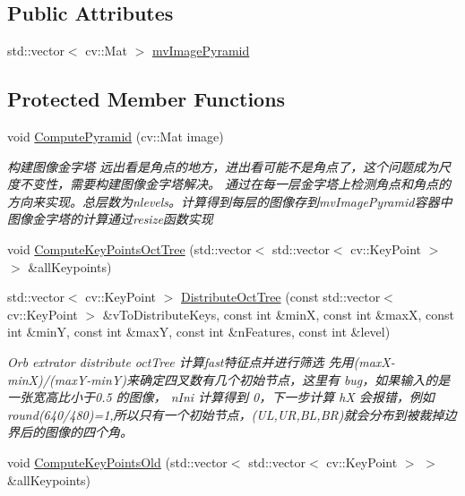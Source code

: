 \subsection*{Public Attributes}
\begin{DoxyCompactItemize}
\item 
std\+::vector$<$ cv\+::\+Mat $>$ \mbox{\hyperlink{class_o_r_b___s_l_a_m2_1_1_o_r_bextractor_a57f88e0959582dde9ae5bdee1fe3de65}{mv\+Image\+Pyramid}}
\end{DoxyCompactItemize}
\subsection*{Protected Member Functions}
\begin{DoxyCompactItemize}
\item 
void \mbox{\hyperlink{class_o_r_b___s_l_a_m2_1_1_o_r_bextractor_a058f24d80bb0b2c7d6fc0bdd3d9144d1}{Compute\+Pyramid}} (cv\+::\+Mat image)
\begin{DoxyCompactList}\small\item\em 构建图像金字塔 远出看是角点的地方，进出看可能不是角点了，这个问题成为尺度不变性，需要构建图像金字塔解决。 通过在每一层金字塔上检测角点和角点的方向来实现。总层数为nlevels。计算得到每层的图像存到mv\+Image\+Pyramid容器中 图像金字塔的计算通过resize函数实现 \end{DoxyCompactList}\item 
void \mbox{\hyperlink{class_o_r_b___s_l_a_m2_1_1_o_r_bextractor_a9a543d9b2aec1e521058ee9522937adc}{Compute\+Key\+Points\+Oct\+Tree}} (std\+::vector$<$ std\+::vector$<$ cv\+::\+Key\+Point $>$ $>$ \&all\+Keypoints)
\item 
std\+::vector$<$ cv\+::\+Key\+Point $>$ \mbox{\hyperlink{class_o_r_b___s_l_a_m2_1_1_o_r_bextractor_ac6b7b27447324af33fa60d6dc0c8ffa0}{Distribute\+Oct\+Tree}} (const std\+::vector$<$ cv\+::\+Key\+Point $>$ \&v\+To\+Distribute\+Keys, const int \&minX, const int \&maxX, const int \&minY, const int \&maxY, const int \&n\+Features, const int \&level)
\begin{DoxyCompactList}\small\item\em Orb extrator distribute oct\+Tree 计算fast特征点并进行筛选 先用(max\+X-\/minX)/(max\+Y-\/minY)来确定四叉数有几个初始节点，这里有 bug，如果输入的是一张宽高比小于0.5 的图像， n\+Ini 计算得到 0，下一步计算 hX 会报错，例如round(640/480)=1,所以只有一个初始节点，(\+U\+L,\+U\+R,\+B\+L,\+B\+R)就会分布到被裁掉边界后的图像的四个角。 \end{DoxyCompactList}\item 
void \mbox{\hyperlink{class_o_r_b___s_l_a_m2_1_1_o_r_bextractor_a56890a2032077fbfdf48687786985548}{Compute\+Key\+Points\+Old}} (std\+::vector$<$ std\+::vector$<$ cv\+::\+Key\+Point $>$ $>$ \&all\+Keypoints)
\end{DoxyCompactItemize}
